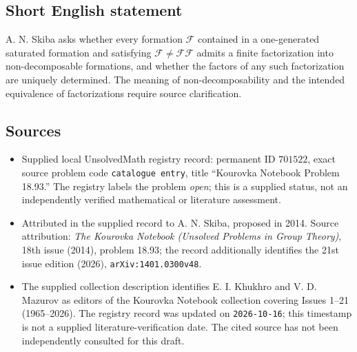 \documentclass[11pt]{article}
\begin{document}
\subsection{Short English statement}
A. N. Skiba asks whether every formation \(\mathcal F\) contained in a one-generated saturated formation and satisfying \(\mathcal F\ne\mathcal F\mathcal F\) admits a finite factorization into non-decomposable formations, and whether the factors of any such factorization are uniquely determined. The meaning of non-decomposability and the intended equivalence of factorizations require source clarification.
\subsection{Sources}
\begin{itemize}
\item Supplied local UnsolvedMath registry record: permanent ID \(701522\), exact source problem code \texttt{catalogue entry}, title ``Kourovka Notebook Problem 18.93.'' The registry labels the problem \emph{open}; this is a supplied status, not an independently verified mathematical or literature assessment.
\item Attributed in the supplied record to A. N. Skiba, proposed in 2014. Source attribution: \emph{The Kourovka Notebook (Unsolved Problems in Group Theory)}, 18th issue (2014), problem 18.93; the record additionally identifies the 21st issue edition (2026), \texttt{arXiv:1401.0300v48}.
\item The supplied collection description identifies E. I. Khukhro and V. D. Mazurov as editors of the Kourovka Notebook collection covering Issues 1--21 (1965--2026). The registry record was updated on \texttt{2026-10-16}; this timestamp is not a supplied literature-verification date. The cited source has not been independently consulted for this draft.
\end{itemize}
\end{document}

